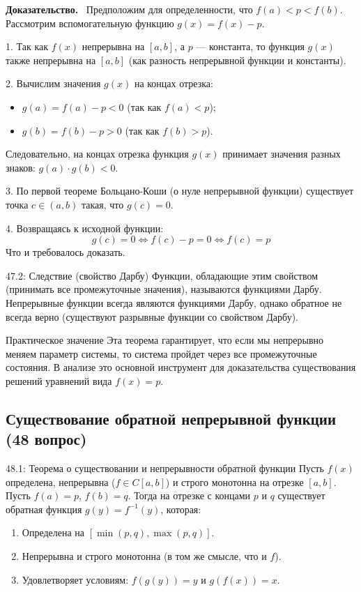 \documentclass[a4paper,12pt]{article}
\newcommand{\myproof}{\textbf{Доказательство.}\ }
\begin{document}
	\myproof
	Предположим для определенности, что $f(a) < p < f(b)$. 
	Рассмотрим вспомогательную функцию $g(x) = f(x) - p$.
	
	1. Так как $f(x)$ непрерывна на $[a, b]$, а $p$ — константа, то функция $g(x)$ также непрерывна на $[a, b]$ (как разность непрерывной функции и константы).
	
	2. Вычислим значения $g(x)$ на концах отрезка:
	\begin{itemize}
		\item $g(a) = f(a) - p < 0$ (так как $f(a) < p$);
		\item $g(b) = f(b) - p > 0$ (так как $f(b) > p$).
	\end{itemize}
	Следовательно, на концах отрезка функция $g(x)$ принимает значения разных знаков: $g(a) \cdot g(b) < 0$.
	
	3. По первой теореме Больцано-Коши (о нуле непрерывной функции) существует точка $c \in (a, b)$ такая, что $g(c) = 0$.
	
	4. Возвращаясь к исходной функции:
	$$ g(c) = 0 \iff f(c) - p = 0 \iff f(c) = p $$
	Что и требовалось доказать.
	
	\begin{notebook}{47.2: Следствие (свойство Дарбу)}
		Функции, обладающие этим свойством (принимать все промежуточные значения), называются функциями Дарбу. Непрерывные функции всегда являются функциями Дарбу, однако обратное не всегда верно (существуют разрывные функции со свойством Дарбу).
	\end{notebook}
	
	\begin{importantbox}{Практическое значение}
		Эта теорема гарантирует, что если мы непрерывно меняем параметр системы, то система пройдет через все промежуточные состояния. В анализе это основной инструмент для доказательства существования решений уравнений вида $f(x) = p$.
	\end{importantbox}
	
	
	
	
	

	\vspace{1cm}
	\subsection{Существование обратной непрерывной функции (48 вопрос)}
	
	\begin{theorembox}{48.1: Теорема о существовании и непрерывности обратной функции}
		Пусть $f(x)$ определена, непрерывна ($f \in C[a, b]$) и строго монотонна на отрезке $[a, b]$. Пусть $f(a) = p$, $f(b) = q$.
		Тогда на отрезке с концами $p$ и $q$ существует обратная функция $g(y) = f^{-1}(y)$, которая:
		\begin{enumerate}
			\item Определена на $[\min(p, q), \max(p, q)]$.
			\item Непрерывна и строго монотонна (в том же смысле, что и $f$).
			\item Удовлетворяет условиям: $f(g(y)) = y$ и $g(f(x)) = x$.
		\end{enumerate}
	\end{theorembox}
	
\end{document}
